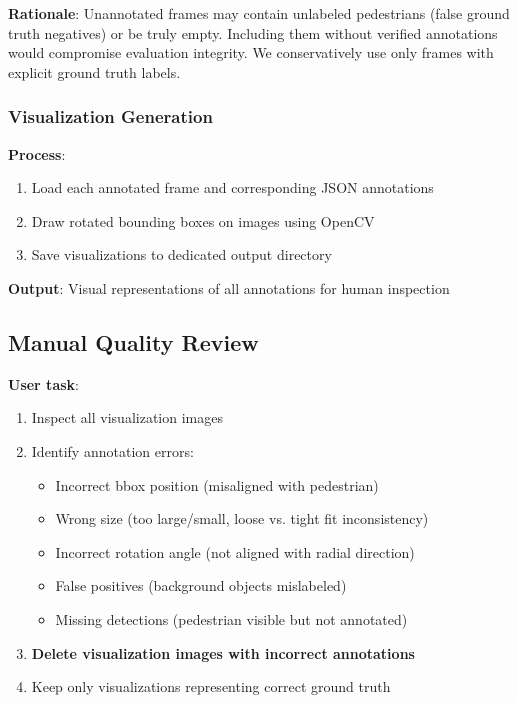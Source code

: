 \documentclass[11pt]{article}
\begin{document}
\textbf{Rationale}: Unannotated frames may contain unlabeled pedestrians (false ground truth negatives) or be truly empty. Including them without verified annotations would compromise evaluation integrity. We conservatively use only frames with explicit ground truth labels.

\subsubsection{Visualization Generation}

\textbf{Process}:
\begin{enumerate}[leftmargin=*]
    \item Load each annotated frame and corresponding JSON annotations
    \item Draw rotated bounding boxes on images using OpenCV
    \item Save visualizations to dedicated output directory
\end{enumerate}

\textbf{Output}: Visual representations of all annotations for human inspection

\subsection{Manual Quality Review}

\textbf{User task}:
\begin{enumerate}[leftmargin=*]
    \item Inspect all visualization images
    \item Identify annotation errors:
        \begin{itemize}
            \item Incorrect bbox position (misaligned with pedestrian)
            \item Wrong size (too large/small, loose vs. tight fit inconsistency)
            \item Incorrect rotation angle (not aligned with radial direction)
            \item False positives (background objects mislabeled)
            \item Missing detections (pedestrian visible but not annotated)
        \end{itemize}
    \item \textbf{Delete visualization images with incorrect annotations}
    \item Keep only visualizations representing correct ground truth
\end{enumerate}
\end{document}
